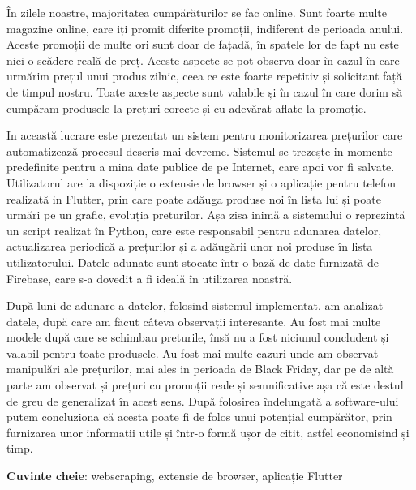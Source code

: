 În zilele noastre, majoritatea cumpărăturilor se fac online. Sunt foarte multe magazine online, care iți promit diferite promoții, indiferent de perioada anului. Aceste promoții de multe ori sunt doar de fațadă, în spatele lor de fapt nu este nici o scădere reală de preț. Aceste aspecte se pot observa doar în cazul în care urmărim prețul unui produs zilnic, ceea ce este foarte repetitiv și solicitant față de timpul nostru. Toate aceste aspecte sunt valabile și în cazul în care dorim să cumpăram produsele la prețuri corecte și cu adevărat aflate la promoție. 

In această lucrare este prezentat un sistem pentru monitorizarea prețurilor care automatizează procesul descris mai devreme. Sistemul se trezește in momente predefinite pentru a mina date publice de pe Internet, care apoi vor fi salvate. Utilizatorul are la dispoziție o extensie de browser și o aplicație pentru telefon realizată in Flutter, prin care poate adăuga produse noi în lista lui și poate urmări pe un grafic, evoluția preturilor. Așa zisa inimă a sistemului o reprezintă un script realizat în Python, care este responsabil pentru adunarea datelor, actualizarea periodică a prețurilor și a adăugării unor noi produse în lista utilizatorului. Datele adunate sunt stocate într-o bază de date furnizată de Firebase, care s-a dovedit a fi ideală în utilizarea noastră. 

După luni de adunare a datelor, folosind sistemul implementat, am analizat datele, după care am făcut câteva observații interesante. Au fost mai multe modele după care se schimbau preturile, însă nu a fost niciunul concludent și valabil pentru toate produsele. Au fost mai multe cazuri unde am observat manipulări ale prețurilor, mai ales in perioada de Black Friday, dar pe de altă parte am observat și prețuri cu promoții reale și semnificative așa că este destul de greu de generalizat în acest sens. După folosirea îndelungată a software-ului putem concluziona că acesta poate fi de folos unui potențial cumpărător, prin furnizarea unor informații utile și într-o formă ușor de citit, astfel economisind și timp. 

\textbf{Cuvinte cheie}: webscraping, extensie de browser, aplicație Flutter
